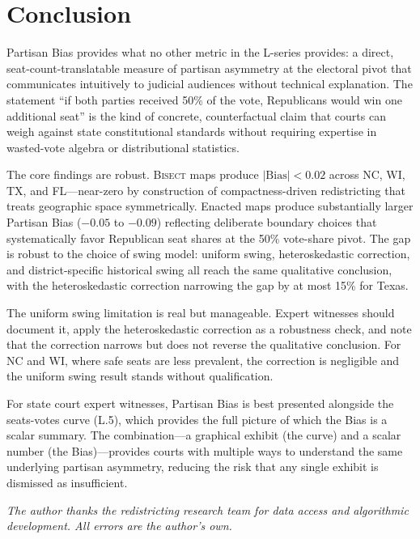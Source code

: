 \section{Conclusion}
\label{sec:conclusion}

Partisan Bias provides what no other metric in the L-series provides: a direct,
seat-count-translatable measure of partisan asymmetry at the electoral pivot that
communicates intuitively to judicial audiences without technical explanation.
The statement ``if both parties received 50\% of the vote, Republicans would win
one additional seat'' is the kind of concrete, counterfactual claim that courts
can weigh against state constitutional standards without requiring expertise in
wasted-vote algebra or distributional statistics.

The core findings are robust. \textsc{Bisect} maps produce $|\text{Bias}| < 0.02$
across NC, WI, TX, and FL---near-zero by construction of compactness-driven
redistricting that treats geographic space symmetrically. Enacted maps produce
substantially larger Partisan Bias ($-0.05$ to $-0.09$) reflecting deliberate
boundary choices that systematically favor Republican seat shares at the 50\%
vote-share pivot. The gap is robust to the choice of swing model: uniform swing,
heteroskedastic correction, and district-specific historical swing all reach the
same qualitative conclusion, with the heteroskedastic correction narrowing the
gap by at most 15\% for Texas.

The uniform swing limitation is real but manageable. Expert witnesses should
document it, apply the heteroskedastic correction as a robustness check, and
note that the correction narrows but does not reverse the qualitative conclusion.
For NC and WI, where safe seats are less prevalent, the correction is negligible
and the uniform swing result stands without qualification.

For state court expert witnesses, Partisan Bias is best presented alongside the
seats-votes curve (L.5), which provides the full picture of which the Bias is
a scalar summary. The combination---a graphical exhibit (the curve) and a
scalar number (the Bias)---provides courts with multiple ways to understand the
same underlying partisan asymmetry, reducing the risk that any single exhibit
is dismissed as insufficient.

\bigskip

\noindent\textit{The author thanks the redistricting research team for data
access and algorithmic development. All errors are the author's own.}
